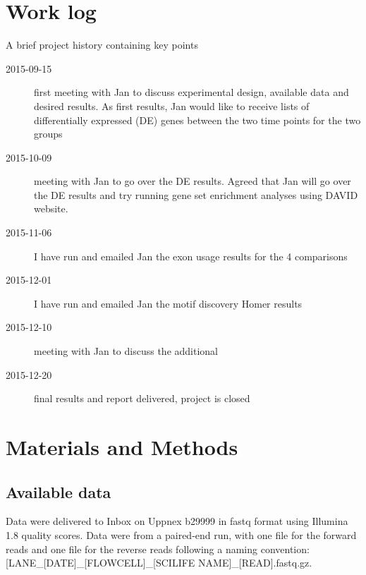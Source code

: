 \documentclass[12pt]{article}
\newcommand{\noUppmax}{b29999}
\begin{document}
\section{Work log}
A brief project history containing key points
\begin{description}
\item[2015-09-15] first meeting with Jan to discuss experimental design, available data and desired results.	As first results, Jan would like to receive lists of differentially expressed (DE) genes between the two time points for the two groups
\item[2015-10-09] meeting with Jan to go over the DE results. Agreed that Jan will go over the DE results and try running gene set enrichment analyses using DAVID website.
\item[2015-11-06] I have run and emailed Jan the exon usage results for the 4 comparisons
\item[2015-12-01] I have run and emailed Jan the motif discovery Homer results
\item[2015-12-10] meeting with Jan to discuss the additional 
\item[2015-12-20] final results and report delivered, project is closed
\end{description}


\section{Materials and Methods}
\subsection{Available data}
Data were delivered to Inbox on Uppnex {\noUppmax} in fastq format using Illumina 1.8 quality scores. Data were from a paired-end run, with one file for the forward reads and one file for the reverse reads following a naming convention: [LANE\_[DATE]\_[FLOWCELL]\_[SCILIFE NAME]\_[READ].fastq.gz. 
\end{document}
